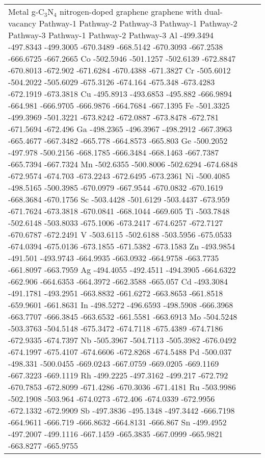 \begin{table}[h]
    \centering
    \begin{tabular}{lr}
      \hline
      Metal	g-C$_3$N$_4$	nitrogen-doped graphene	graphene with dual-vacancy
	    Pathway-1	Pathway-2	Pathway-3	Pathway-1	Pathway-2	Pathway-3	Pathway-1	Pathway-2	Pathway-3
      \hline
      Al	-499.3494	-497.8343	-499.3005	-670.3489	-668.5142	-670.3093	-667.2538	-666.6725	-667.2665
      Co	-502.5946	-501.1257	-502.6139	-672.8847	-670.8013	-672.902	-671.6284	-670.4388	-671.3827
      Cr	-505.6012	-504.2022	-505.6029	-675.3126	-674.164	-675.348	-673.4283	-672.1919	-673.3818
      Cu	-495.8913	-493.6853	-495.882	-666.9894	-664.981	-666.9705	-666.9876	-664.7684	-667.1395
      Fe	-501.3325	-499.3969	-501.3221	-673.8242	-672.0887	-673.8478	-672.781	-671.5694	-672.496
      Ga	-498.2365	-496.3967	-498.2912	-667.3963	-665.4677	-667.3482	-665.778	-664.8573	-665.803
      Ge	-500.2052	-497.978	-500.2156	-668.1785	-666.3484	-668.1463	-667.7387	-665.7394	-667.7324
      Mn	-502.6355	-500.8006	-502.6294	-674.6848	-672.9574	-674.703	-673.2243	-672.6495	-673.2361
      Ni	-500.4085	-498.5165	-500.3985	-670.0979	-667.9544	-670.0832	-670.1619	-668.3684	-670.1756
      Sc	-503.4428	-501.6129	-503.4437	-673.959	-671.7624	-673.3818	-670.0841	-668.1044	-669.605
      Ti	-503.7848	-502.6148	-503.8033	-675.1006	-673.2417	-674.6257	-672.7127	-670.6787	-672.2491
      V	  -503.6115	-502.6188	-503.5956	-675.0533	-674.0394	-675.0136	-673.1855	-671.5382	-673.1583
      Zn	-493.9854	-491.501	-493.9743	-664.9935	-663.0932	-664.9758	-663.7735	-661.8097	-663.7959
      Ag	-494.4055	-492.4511	-494.3905	-664.6322	-662.906	-664.6353	-664.3972	-662.3588	-665.057
      Cd	-493.3084	-491.1781	-493.2951	-663.8832	-661.6272	-663.8653	-661.8518	-659.9601	-661.8631
      In	-498.5272	-496.6593	-498.5908	-666.3968	-663.7707	-666.3845	-663.6532	-661.5581	-663.6913
      Mo	-504.5248	-503.3763	-504.5148	-675.3472	-674.7118	-675.4389	-674.7186	-672.9335	-674.7397
      Nb	-505.3967	-504.7113	-505.3982	-676.0492	-674.1997	-675.4107	-674.6606	-672.8268	-674.5488
      Pd	-500.037	-498.331	-500.0455	-669.0243	-667.0759	-669.0205	-669.1169	-667.3223	-669.1119
      Rh	-499.2225	-497.3162	-499.217	-672.792	-670.7853	-672.8099	-671.4286	-670.3036	-671.4181
      Ru	-503.9986	-502.1908	-503.964	-674.0273	-672.406	-674.0339	-672.9956	-672.1332	-672.9909
      Sb	-497.3836	-495.1348	-497.3442	-666.7198	-664.9611	-666.719	-666.8632	-664.8131	-666.867
      Sn	-499.4952	-497.2007	-499.1116	-667.1459	-665.3835	-667.0999	-665.9821	-663.8277	-665.9755

\end{tabular}
\end{table}
